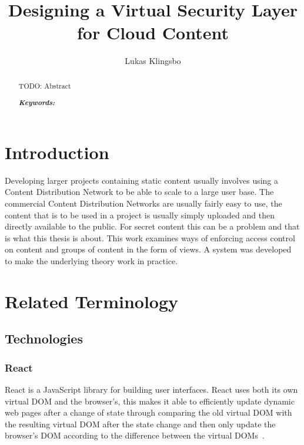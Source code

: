 \documentclass[a4paper,12pt]{article}
\title{\textbf{Designing a Virtual Security Layer for Cloud Content}}
\author{Lukas Klingsbo}
\providecommand{\keywords}[1]{\textbf{\textit{Keywords: }} #1}
\begin{document}
\maketitle
%

\setcounter{page}{2}

%
\begin{abstract}
    TODO: Abstract

\keywords{}
\end{abstract}

\newpage\null\thispagestyle{empty}\newpage

\setcounter{tocdepth}{3}
\tableofcontents

\clearpage
{}
\setcounter{page}{1}
\section{Introduction}
Developing larger projects containing static content usually involves using a Content Distribution Network 
to be able to scale to a large user base. The commercial Content Distribution Networks are usually fairly easy to use, 
the content that is to be used in a project is usually simply uploaded and then directly available to the public. 
For secret content this can be a problem and that is what this thesis is about. This work examines ways of enforcing 
access control on content and groups of content in the form of views. A system was developed to make the underlying 
theory work in practice. 

\newpage
\section{Related Terminology}
\subsection{Technologies}
\subsubsection{React}
React is a JavaScript library for building user interfaces. React uses both its own virtual DOM and the browser's, 
this makes it able to efficiently update dynamic web pages after a change of state through comparing the old virtual 
DOM with the resulting virtual DOM after the state change and then only update the browser's DOM according to the 
difference between the virtual DOMs~\cite{REACT}.
\end{document}
